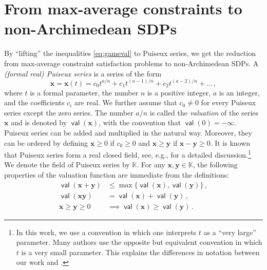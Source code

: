 \documentclass[11pt]{article}
\theoremstyle{definition}
\theoremstyle{remark}
\newcommand{\puiseux}{\mathbb{K}}
\DeclareMathOperator*{\val}{\mathsf{val}}
\begin{document}
\section{From max-average constraints to non-Archimedean SDPs}\label{sec:nonArchSDP}
By ``lifting'' the inequalities \cref{eq:gameval} to Puiseux series, we get the reduction from max-average constraint satisfaction problems to non-Archimedean SDPs. 
A \emph{(formal real) Puiseux series} is a series of the form
\[
\bm{x} = \bm{x}(t) = c_0t^{a/n} + c_1t^{(a-1)/n} + c_2t^{(a-2)/n} + \dots \, ,
\]
where $t$ is a formal parameter, the number $n$ is a positive integer, $a$ is an integer, and the coefficients $c_i$ are real. We further assume that $c_0 \neq 0$ for every Puiseux series except the zero series. The number $a/n$ is called the \emph{valuation} of the series $\bm{x}$ and is denoted by $\val(\bm{x})$, with the convention that $\val(0) = -\infty$.  Puiseux series can be added and multiplied in the natural way. Moreover, they can be ordered by defining $\bm{x} \ge 0$ if $c_0 \ge 0$ and $\bm{x} \ge \bm{y}$ if $\bm{x} - \bm{y} \ge 0$. It is known that Puiseux series form a real closed field, see, e.g., \cite[Section~2.6]{basu_pollack_roy_algorithms} for a detailed discussion.\footnote{In this work, we use a convention in which one interprets $t$ as a ``very large'' parameter. Many authors use the opposite but equivalent convention in which $t$ is a very small parameter. This explains the differences in notation between our work and \cite{basu_pollack_roy_algorithms}.} We denote the field of Puiseux series by $\puiseux$. For any $\bm{x}, \bm{y} \in \puiseux$, the following properties of the valuation function are immediate from the definitions:
\begin{equation}\label{eq:valuation}
\begin{aligned}
\val(\bm{x} + \bm{y}) &\le \max\{\val(\bm{x}), \val(\bm{y})\} \, ,\\
\val(\bm{x}\bm{y}) &= \val(\bm{x}) + \val(\bm{y}) \, ,\\
\bm{x} \ge \bm{y} \ge 0 &\implies \val(\bm{x}) \ge \val(\bm{y}) \, .
\end{aligned}
\end{equation}
\end{document}
